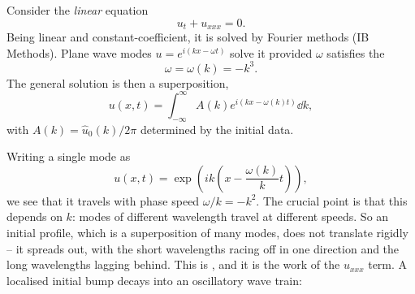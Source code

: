 \begin{example}[Dispersion]
	Consider the \emph{linear} equation
	$$
	u_t + u_{xxx} = 0.
	$$
	Being linear and constant-coefficient, it is solved by Fourier methods (IB Methods). Plane wave modes $u = e^{i(kx - \omega t)}$ solve it provided $\omega$ satisfies the 
	$$
	\omega = \omega(k) = -k^3.
	$$
	The general solution is then a superposition,
	$$
	u(x,t) = \int_{-\infty}^\infty A(k)e^{i(kx - \omega(k)t)}\dd k,
	$$
	with $A(k) = \hat u_0(k)/2\pi$ determined by the initial data.

	Writing a single mode as
	$$
	u(x,t) = \exp\left(ik\left(x - \frac{\omega(k)}{k}t\right)\right),
	$$
	we see that it travels with phase speed $\omega/k = -k^2$. The crucial point is that this depends on $k$: modes of different wavelength travel at different speeds. So an initial profile, which is a superposition of many modes, does not translate rigidly -- it spreads out, with the short wavelengths racing off in one direction and the long wavelengths lagging behind. This is , and it is the work of the $u_{xxx}$ term. A localised initial bump decays into an oscillatory wave train:
	\begin{center}
\end{center}
\end{example}
